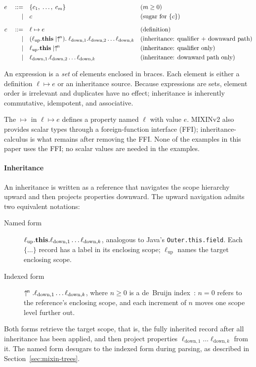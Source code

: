 \begin{align*}
  e \quad ::= \quad & \{c_1,\; \ldots,\; c_m\}
  && \text{(} m \ge 0 \text{)} \\
  \mid\quad & c
  && \text{(sugar for } \{c\} \text{)} \\[6pt]
  c \quad ::= \quad & \ell \mapsto e
  && \text{(definition)} \\
  \mid\quad & (\ell_{\mathrm{up}}.\mathbf{this} \mid \uparrow^{\!n}).\;\ell_{\mathrm{down},1}.\ell_{\mathrm{down},2}\ldots\ell_{\mathrm{down},k}
  && \text{(inheritance: qualifier + downward path)} \\
  \mid\quad & \ell_{\mathrm{up}}.\mathbf{this} \mid \uparrow^{\!n}
  && \text{(inheritance: qualifier only)} \\
  \mid\quad & \ell_{\mathrm{down},1}.\ell_{\mathrm{down},2}\ldots\ell_{\mathrm{down},k}
  && \text{(inheritance: downward path only)}
\end{align*}

An expression is a \emph{set} of elements enclosed in braces.
Each element is either a definition $\ell \mapsto e$ or
an inheritance source.
Because expressions are sets, element order is irrelevant and
duplicates have no effect; inheritance is inherently commutative,
idempotent, and associative.

The $\mapsto$ in $\ell \mapsto e$ defines a property named $\ell$ with value $e$.
MIXINv2 also provides scalar types through a
foreign-function interface (FFI); inheritance-calculus is what remains
after removing the FFI.
None of the examples in this paper uses the FFI; no scalar values are needed in the examples.

\paragraph{Inheritance}
An inheritance is written as a reference
that navigates the scope hierarchy upward and then projects
properties downward. The upward navigation admits two equivalent
notations:
\begin{description}
  \item[Named form]
    $\ell_{\mathrm{up}}.\mathbf{this}.\ell_{\mathrm{down},1}\ldots\ell_{\mathrm{down},k}$,
    analogous to Java's \texttt{Outer.this.field}.
    Each $\{\ldots\}$ record has a label in its enclosing scope;
    $\ell_{\mathrm{up}}$ names the target enclosing scope.
  \item[Indexed form]
    $\uparrow^{\!n}.\ell_{\mathrm{down},1}\ldots\ell_{\mathrm{down},k}$,
    where $n \ge 0$ is a de~Bruijn index~\cite{debruijn1972-nameless-dummies}:
    $n = 0$ refers to the reference's enclosing scope,
    and each increment of $n$ moves one scope level further out.
\end{description}
Both forms retrieve the target scope, that is, the fully inherited record
after all inheritance has been applied, and then project properties
$\ell_{\mathrm{down},1}\ldots\ell_{\mathrm{down},k}$ from it.
The named form desugars to the indexed form during parsing,
as described in Section~\ref{sec:mixin-trees}.

